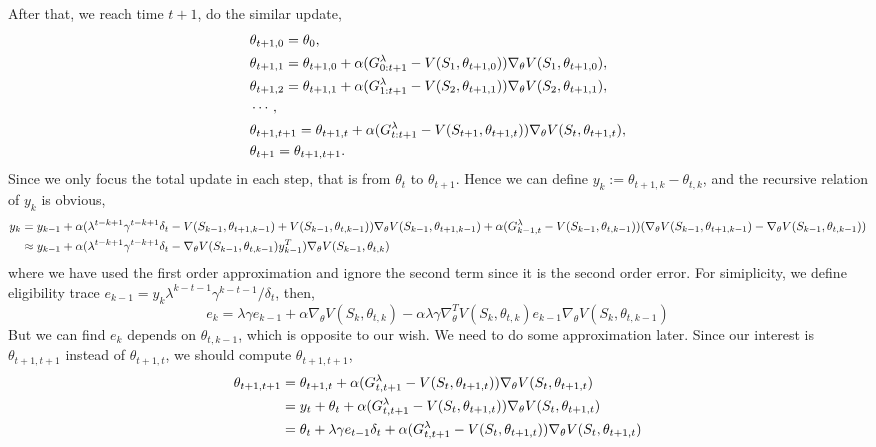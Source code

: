 \documentclass[11pt,a4paper]{article}
\begin{document}
After that, we reach time $t+1$, do the similar update, 
\begin{equation}
    \aligned 
    & \theta_{t+1,0} = \theta_0, \\ 
    & \theta_{t+1,1} = \theta_{t+1,0} + \alpha (G_{0:t+1}^{\lambda} - V(S_1, \theta_{t+1, 0})) \nabla_{\theta}V(S_1, \theta_{t+1, 0}), \\ 
    & \theta_{t+1,2} = \theta_{t+1,1} + \alpha(G_{1:t+1}^{\lambda} - V(S_2, \theta_{t+1, 1})) \nabla_{\theta}V(S_2, \theta_{t+1,1}), \\ 
    & \cdots , \\ 
    & \theta_{t+1,t+1} = \theta_{t+1,t} + \alpha(G_{t:t+1}^{\lambda} - V(S_{t+1}, \theta_{t+1,t})) \nabla_{\theta}V(S_t, \theta_{t+1,t}), \\ 
    & \theta_{t+1} = \theta_{t+1,t+1}.
    \endaligned 
\end{equation}
Since we only focus the total update in each step, that is from $\theta_t$ to $\theta_{t+1}$. Hence we can define $y_k := \theta_{t+1, k} - \theta_{t,k}$, and the recursive relation of $y_k$ is obvious, 
\begin{equation}
\aligned 
y_{k} & = y_{k-1} + \alpha(\lambda^{t-k+1}\gamma^{t-k+1}\delta_t - V(S_{k-1}, \theta_{t+1,k-1}) + V(S_{k-1}, \theta_{t,k-1}))\nabla_{\theta}V(S_{k-1}, \theta_{t+1,k-1}) + \alpha(G_{k-1,t}^{\lambda}-V(S_{k-1}, \theta_{t, k-1}))(\nabla_\theta V(S_{k-1}, \theta_{t+1, k-1})-\nabla_\theta V(S_{k-1}, \theta_{t, k-1})) \\ 
& \approx y_{k-1} + \alpha(\lambda^{t-k+1}\gamma^{t-k+1}\delta_t - \nabla_{\theta}V(S_{k-1}, \theta_{t,k-1})y_{k-1}^T) \nabla_\theta V(S_{k-1}, \theta_{t, k}) 
\endaligned 
\end{equation}
where we have used the first order approximation and ignore the second term since it is the second order error. For simiplicity, we define eligibility trace $e_{k-1} = y_k \lambda^{k-t-1}\gamma^{k-t-1}/\delta_t$, then, 
\begin{equation}
    \label{eq: trace}
    e_k = \lambda\gamma e_{k-1} + \alpha \nabla_{\theta}V(S_{k}, \theta_{t,k}) - \alpha \lambda \gamma \nabla_{\theta}^TV(S_{k},\theta_{t,k}) e_{k-1} \nabla_{\theta}V(S_{k}, \theta_{t,k-1})
\end{equation}
But we can find $e_k$ depends on $\theta_{t, k-1}$, which is opposite to our wish. We need to do some approximation later.
Since our interest is $\theta_{t+1,t+1}$ instead of $\theta_{t+1,t}$, we should compute $\theta_{t+1,t+1}$,
\begin{equation}
    \aligned 
    \theta_{t+1,t+1} & = \theta_{t+1,t} + \alpha (G_{t,t+1}^{\lambda} - V(S_{t}, \theta_{t+1, t}))\nabla_\theta V(S_t,\theta_{t+1,t}) \\ 
    & = y_t + \theta_t + \alpha (G_{t,t+1}^{\lambda} - V(S_{t}, \theta_{t+1, t}))\nabla_\theta V(S_t,\theta_{t+1,t}) \\ 
    & = \theta_t + \lambda \gamma e_{t-1} \delta_t + \alpha (G_{t,t+1}^{\lambda} - V(S_{t}, \theta_{t+1, t}))\nabla_\theta V(S_t,\theta_{t+1,t}) \\ 
    \endaligned
\end{equation}
\end{document}
